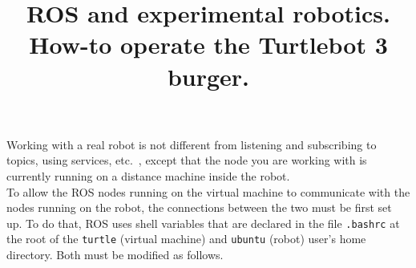 \documentclass[10pt,a4paper,printanswers]{upmc}
\title{ROS and experimental robotics.\\ How-to operate the Turtlebot 3 burger.}
\begin{document}
\maketitle

Working with a real robot is not different from listening and subscribing to topics, using services,
etc.\ , except that the node you are working with is currently running on a distance
machine inside the robot.\\

To allow the ROS nodes running on the virtual machine to communicate with the nodes running
on the robot, the connections between the two must be first set up. To do that, ROS uses shell
variables that are declared in the file \texttt{.bashrc} at the root of the \texttt{turtle}
(virtual machine) and \texttt{ubuntu} (robot) user's home directory. Both must be modified as follows.
\end{document}
